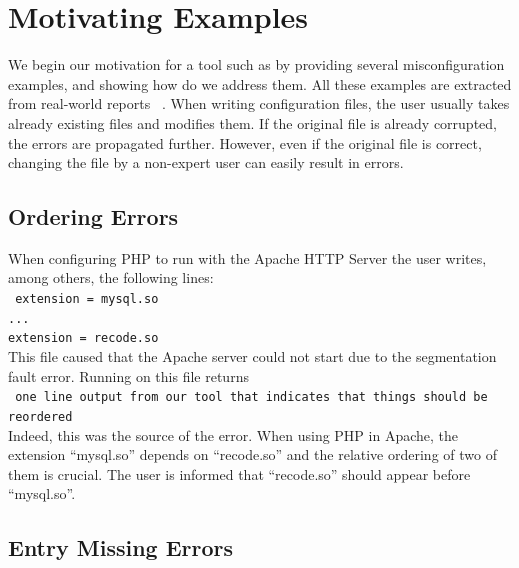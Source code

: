 \section{Motivating Examples}
\label{sec:motiv}

We begin our motivation for a tool such as \app by providing several misconfiguration examples, and showing how do we address them. All these examples are extracted from real-world reports%
~\cite{yin11anempirical, configdataset}. When writing configuration files, the user usually takes already existing files and modifies them. If the original file is already corrupted, the errors are propagated further. However, even if the original file is correct, changing the file by a non-expert user can easily result in errors.


\subsection{Ordering Errors}

When configuring PHP to run with the Apache HTTP Server the user writes, among others, the following lines:\\
 \texttt{
 \hspace*{3em}extension = mysql.so\\
 \hspace*{3em}...\\
 \hspace*{3em}extension = recode.so}\\
This file caused that the Apache server could not start due to 
the segmentation fault error. Running \app on this file returns\\
 \texttt{
  one line output from our tool that indicates that things should be reordered}\\
Indeed, this was the source of the error. When using PHP in Apache, the
extension ``mysql.so'' depends on ``recode.so'' and the relative ordering 
of two of them is crucial. The user is informed that ``recode.so'' should appear before ``mysql.so''.

\subsection{Entry Missing Errors}

